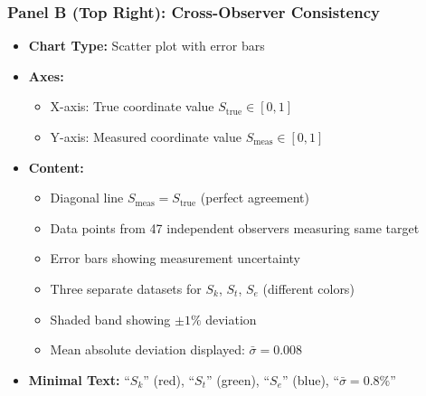 \subsubsection*{Panel B (Top Right): Cross-Observer Consistency}
\begin{itemize}
\item \textbf{Chart Type:} Scatter plot with error bars
\item \textbf{Axes:}
  \begin{itemize}
  \item X-axis: True coordinate value $S_{\text{true}} \in [0,1]$
  \item Y-axis: Measured coordinate value $S_{\text{meas}} \in [0,1]$
  \end{itemize}
\item \textbf{Content:}
  \begin{itemize}
  \item Diagonal line $S_{\text{meas}} = S_{\text{true}}$ (perfect agreement)
  \item Data points from 47 independent observers measuring same target
  \item Error bars showing measurement uncertainty
  \item Three separate datasets for $S_k$, $S_t$, $S_e$ (different colors)
  \item Shaded band showing $\pm 1\%$ deviation
  \item Mean absolute deviation displayed: $\bar{\sigma} = 0.008$
  \end{itemize}
\item \textbf{Minimal Text:} ``$S_k$'' (red), ``$S_t$'' (green), ``$S_e$'' (blue), ``$\bar{\sigma} = 0.8\%$''
\end{itemize}

